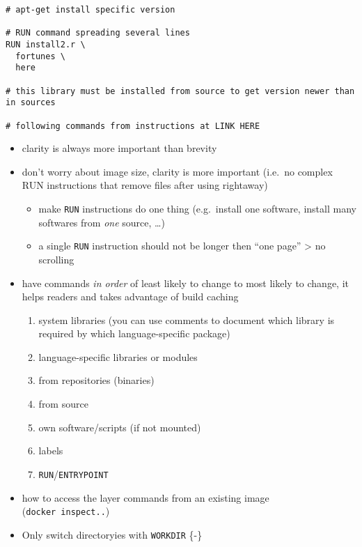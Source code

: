 \documentclass[10pt,letterpaper]{article}
\providecommand{\tightlist}{%
  \setlength{\itemsep}{0pt}\setlength{\parskip}{0pt}}
\begin{document}
\begin{verbatim}
# apt-get install specific version

# RUN command spreading several lines
RUN install2.r \
  fortunes \
  here

# this library must be installed from source to get version newer than in sources

# following commands from instructions at LINK HERE
\end{verbatim}

\begin{itemize}
\tightlist
\item
  clarity is always more important than brevity
\item
  don't worry about image size, clarity is more important (i.e.~no
  complex RUN instructions that remove files after using rightaway)

  \begin{itemize}
  \tightlist
  \item
    make \texttt{RUN} instructions do one thing (e.g.~install one
    software, install many softwares from \emph{one} source, \ldots{})
  \item
    a single \texttt{RUN} instruction should not be longer then ``one
    page'' \textgreater{} no scrolling
  \end{itemize}
\item
  have commands \emph{in order} of least likely to change to most likely
  to change, it helps readers and takes advantage of build caching

  \begin{enumerate}
  \def\labelenumi{\arabic{enumi}.}
  \tightlist
  \item
    system libraries (you can use comments to document which library is
    required by which language-specific package)
  \item
    language-specific libraries or modules
  \item
    from repositories (binaries)
  \item
    from source
  \item
    own software/scripts (if not mounted)
  \item
    labels
  \item
    \texttt{RUN}/\texttt{ENTRYPOINT}
  \end{enumerate}
\item
  how to access the layer commands from an existing image
  (\texttt{docker\ inspect..})
\item
  Only switch directoryies with \texttt{WORKDIR} \{-\}


\end{itemize}
\end{document}
